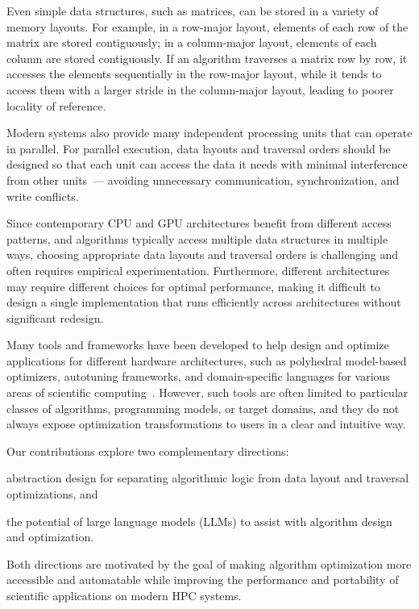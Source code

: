 Even simple data structures, such as matrices, can be stored in a variety of memory layouts. For example, in a row-major layout, elements of each row of the matrix are stored contiguously; in a column-major layout, elements of each column are stored contiguously. If an algorithm traverses a matrix row by row, it accesses the elements sequentially in the row-major layout, while it tends to access them with a larger stride in the column-major layout, leading to poorer locality of reference.

Modern systems also provide many independent processing units that can operate in parallel. For parallel execution, data layouts and traversal orders should be designed so that each unit can access the data it needs with minimal interference from other units~--- avoiding unnecessary communication, synchronization, and write conflicts.

Since contemporary CPU and GPU architectures benefit from different access patterns, and algorithms typically access multiple data structures in multiple ways, choosing appropriate data layouts and traversal orders is challenging and often requires empirical experimentation. Furthermore, different architectures may require different choices for optimal performance, making it difficult to design a single implementation that runs efficiently across architectures without significant redesign.

Many tools and frameworks have been developed to help design and optimize applications for different hardware architectures, such as polyhedral model-based optimizers, autotuning frameworks, and domain-specific languages for various areas of scientific computing~\cite{bondhugula2008pluto,ansel2014opentuner,ragan2013halide,baghdadi2019tiramisu}. However, such tools are often limited to particular classes of algorithms, programming models, or target domains, and they do not always expose optimization transformations to users in a clear and intuitive way.

Our contributions explore two complementary directions:
\begin{inparaenum}[(i)]
\item abstraction design for separating algorithmic logic from data layout and traversal optimizations, and
\item the potential of large language models (LLMs) to assist with algorithm design and optimization.
\end{inparaenum}
Both directions are motivated by the goal of making algorithm optimization more accessible and automatable while improving the performance and portability of scientific applications on modern HPC systems.

